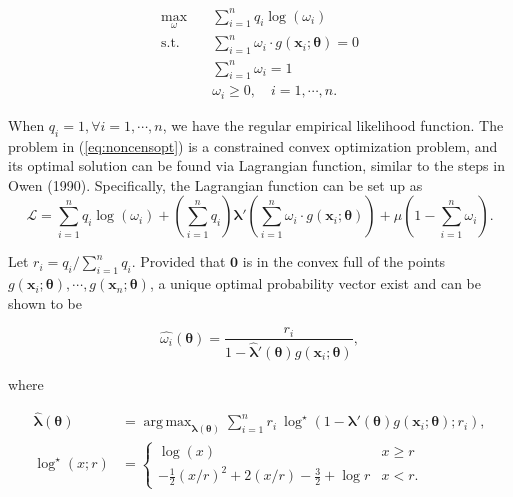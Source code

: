 \documentclass[article]{jss}
\renewcommand{\|}{\,|\,}
\begin{document}
\begin{equation} \label{eq:noncensopt}
\begin{split}
  \max_{\omega}\quad & \sum_{i=1}^n q_i \log(\omega_i) \\
  \text{s.t.}\quad & \sum_{i=1}^n \omega_i\cdot g(\bm x_i;\bm \theta) = 0 \\
  & \sum_{i=1}^n \omega_i = 1 \\
  & \omega_i \geq 0, \quad i=1,\cdots,n.
\end{split}
\end{equation}

When \(q_i = 1, \forall i=1,\cdots,n\), we have the regular empirical likelihood function. The problem in (\ref{eq:noncensopt}) is a constrained convex optimization problem, and its optimal solution can be found via Lagrangian function, similar to the steps in Owen (1990). Specifically, the Lagrangian function can be set up as
\begin{equation} \label{eq:lagrange}
  \mathcal{L}= \sum_{i=1}^n q_i\log(\omega_i) + (\sum_{i=1}^n q_i)\bm \lambda'(\sum_{i=1}^n \omega_i \cdot g(\bm x_i;\bm \theta)) + \mu(1-\sum_{i=1}^n \omega_i).
\end{equation}

Let \(r_i = q_i/\sum_{i=1}^n q_i\). Provided that \(\bm 0\) is in the convex full of the points \(g(\bm x_i;\bm \theta),\cdots,g(\bm x_n;\bm \theta)\), a unique optimal probability vector exist and can be shown to be

\begin{equation}\label{eq:omegahat}
  \hat{\omega_i}(\bm \theta) = \frac{r_i}{1 - \hat{\bm \lambda}'(\bm \theta) g(\bm x_i;\bm \theta)},
\end{equation}

where

\begin{equation}
\begin{aligned}
\hat{\bm \lambda}(\bm \theta) &= \mathop{\mathrm{arg\,max}}_{\bm \lambda(\bm \theta)} \sum_{i=1}^n r_i\ {\log}^{\star}\left(1 - \bm \lambda'(\bm \theta) g(\bm x_i;\bm \theta); r_i\right), \\
{\log}^{\star}(x; r) &=
\begin{cases}
\log(x) & x \ge r \\
- \frac{1}{2} (x/r)^2 + 2 (x/r) - \frac{3}{2} + \log r & x < r.
\end{cases}
\end{aligned}
\label{eq:optim}
\end{equation}
\end{document}
